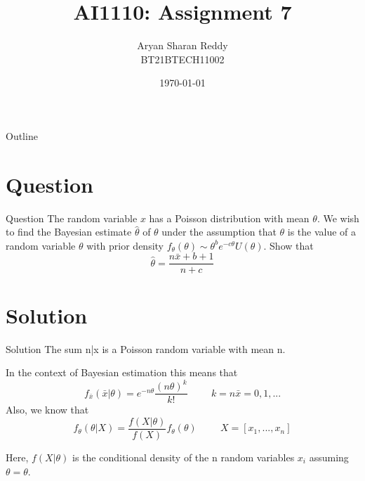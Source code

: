 \documentclass{beamer}
\title{AI1110: Assignment 7}
\author{Aryan Sharan Reddy\\BT21BTECH11002}
\date{\today}
\begin{document}
\begin{frame}
    \titlepage 
\end{frame}



\begin{frame}{Outline}
    \tableofcontents
\end{frame}


\section{Question}
\begin{frame}{Question}
  The random variable $x$ has a Poisson distribution with mean $\theta$. We wish to find the Bayesian estimate $\hat{\theta}$ of $\theta$ under the assumption that $\theta$ is the value of a random variable $\theta$ with prior density $f_{\theta}(\theta) \sim {\theta}^{b}e^{-c\theta}U(\theta)$.  Show that $$\hat{\theta} = \dfrac{n\bar{x}+b+1}{n+c}$$

\end{frame}

\section{Solution}
\begin{frame}{Solution}
The sum n\bar{x} is a Poisson random variable with mean n\theta.

In the context of Bayesian estimation this means that
\begin{equation}
    f_{\bar{x}}(\bar{x}|\theta)= e^{-n\theta}\dfrac{(n\theta)^k}{k!} \hspace{1cm}             k=n\bar{x}=0,1,...
    \label{eq:1}
\end{equation}
Also, we know that
\begin{equation}
    f_{\theta}(\theta|X)= \dfrac{f(X|\theta)}{f(X)}f_{\theta}(\theta) \hspace{1cm} X = [x_1, ..., x_n]
    \label{eq:2}
\end{equation}

Here, $f(X|\theta)$ is the conditional density of the n random variables $x_i$ assuming $\theta = \theta$. 
\end{frame}
\end{document}
